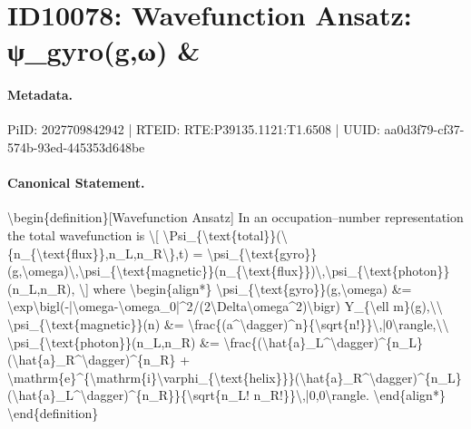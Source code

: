 \section*{ID10078: Wavefunction Ansatz: ψ\_gyro(g,ω) \&}
\paragraph{Metadata.}
PiID: 2027709842942 | RTEID: RTE:P39135.1121:T1.6508 | UUID: aa0d3f79-cf37-574b-93ed-445353d648be

\paragraph{Canonical Statement.}
\textbackslash{}begin\{definition\}[Wavefunction Ansatz] In an occupation–number representation the total wavefunction is \textbackslash{}[ \textbackslash{}Psi\_\{\textbackslash{}text\{total\}\}(\textbackslash{}\{n\_\{\textbackslash{}text\{flux\}\},n\_L,n\_R\textbackslash{}\},t) = \textbackslash{}psi\_\{\textbackslash{}text\{gyro\}\}(g,\textbackslash{}omega)\textbackslash{},\textbackslash{}psi\_\{\textbackslash{}text\{magnetic\}\}(n\_\{\textbackslash{}text\{flux\}\})\textbackslash{},\textbackslash{}psi\_\{\textbackslash{}text\{photon\}\}(n\_L,n\_R), \textbackslash{}] where \textbackslash{}begin\{align*\} \textbackslash{}psi\_\{\textbackslash{}text\{gyro\}\}(g,\textbackslash{}omega) \&= \textbackslash{}exp\textbackslash{}bigl(-|\textbackslash{}omega-\textbackslash{}omega\_0|\textasciicircum{}2/(2\textbackslash{}Delta\textbackslash{}omega\textasciicircum{}2)\textbackslash{}bigr) Y\_\{\textbackslash{}ell m\}(g),\textbackslash{}\textbackslash{} \textbackslash{}psi\_\{\textbackslash{}text\{magnetic\}\}(n) \&= \textbackslash{}frac\{(a\textasciicircum{}\textbackslash{}dagger)\textasciicircum{}n\}\{\textbackslash{}sqrt\{n!\}\}\textbackslash{},|0\textbackslash{}rangle,\textbackslash{}\textbackslash{} \textbackslash{}psi\_\{\textbackslash{}text\{photon\}\}(n\_L,n\_R) \&= \textbackslash{}frac\{(\textbackslash{}hat\{a\}\_L\textasciicircum{}\textbackslash{}dagger)\textasciicircum{}\{n\_L\}(\textbackslash{}hat\{a\}\_R\textasciicircum{}\textbackslash{}dagger)\textasciicircum{}\{n\_R\} + \textbackslash{}mathrm\{e\}\textasciicircum{}\{\textbackslash{}mathrm\{i\}\textbackslash{}varphi\_\{\textbackslash{}text\{helix\}\}\}(\textbackslash{}hat\{a\}\_R\textasciicircum{}\textbackslash{}dagger)\textasciicircum{}\{n\_L\}(\textbackslash{}hat\{a\}\_L\textasciicircum{}\textbackslash{}dagger)\textasciicircum{}\{n\_R\}\}\{\textbackslash{}sqrt\{n\_L! n\_R!\}\}\textbackslash{},|0,0\textbackslash{}rangle. \textbackslash{}end\{align*\} \textbackslash{}end\{definition\}

